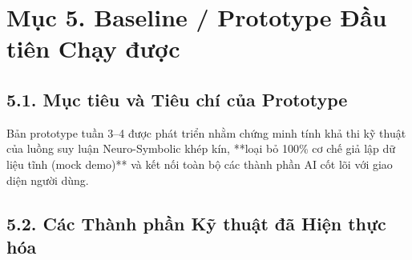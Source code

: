 \documentclass[a4paper,12pt]{article}
\begin{document}
\section{Mục 5. Baseline / Prototype Đầu tiên Chạy được}

\subsection{5.1. Mục tiêu và Tiêu chí của Prototype}
Bản prototype tuần 3--4 được phát triển nhằm chứng minh tính khả thi kỹ thuật của luồng suy luận Neuro-Symbolic khép kín, **loại bỏ 100\% cơ chế giả lập dữ liệu tĩnh (mock demo)** và kết nối toàn bộ các thành phần AI cốt lõi với giao diện người dùng.

\subsection{5.2. Các Thành phần Kỹ thuật đã Hiện thực hóa}
\end{document}
